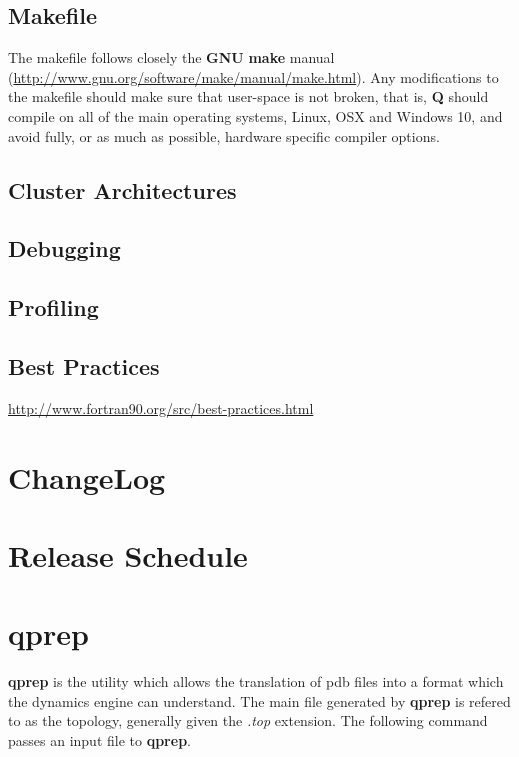 \documentclass[10pt, oneside, pdftex]{article}
\begin{document}
\subsection{Makefile}
\label{makefile}
The  makefile follows  closely the  \textbf{GNU} \textbf{make}  manual
(\url{http://www.gnu.org/software/make/manual/make.html}).         Any
modifications to the makefile should  make sure that user-space is not
broken,  that  is,  \textbf{Q}  should  compile on  all  of  the  main
operating systems, Linux,  OSX and Windows 10, and avoid  fully, or as
much as possible, hardware specific compiler options.\\

\subsection{Cluster Architectures}
\label{clusterarchitectures}


\subsection{Debugging}
\label{debugging}


\subsection{Profiling}
\label{profiling}

\subsection{Best Practices}
\label{bestpractices}

\url{http://www.fortran90.org/src/best-practices.html}


\section{ChangeLog}
\label{changelog}


\section{Release Schedule}
\label{schedule}


\section{qprep}
\label{qprep}
\textbf{qprep}  is the  utility which  allows the  translation of  pdb
files into a format which the dynamics engine can understand. The main
file  generated  by \textbf{qprep}  is  refered  to as  the  topology,
generally  given the  \textit{.top} extension.  The following  command
passes an input file to \textbf{qprep}.
\end{document}
